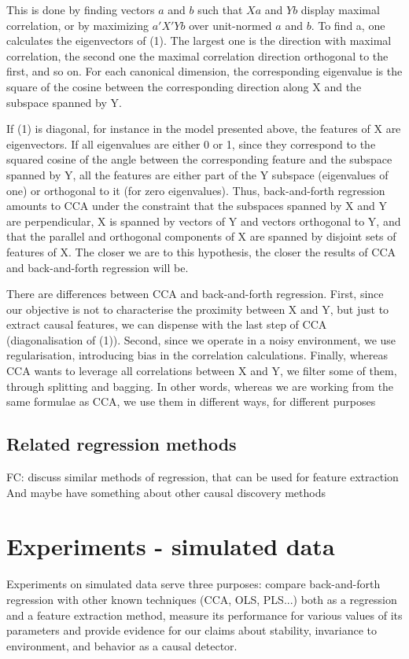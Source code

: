 \documentclass{article}
\begin{document}
This is done by finding vectors $a$ and $b$ such that $Xa$ and $Yb$ display maximal correlation, or by maximizing $a'X'Yb$ over unit-normed $a$ and $b$.
%
To find a, one calculates the eigenvectors of (1).
%
The largest one is the direction with maximal correlation, the second one the maximal correlation direction orthogonal to the first, and so on.
%
For each canonical dimension, the corresponding eigenvalue is the square of the cosine between the corresponding direction along X and the subspace spanned by Y.

If (1) is diagonal, for instance in the model presented above, the features of X are eigenvectors.
%
If all eigenvalues are either 0 or 1, since they correspond to the squared cosine of the angle between the corresponding feature and the subspace spanned by Y, all the features are either part of the Y subspace (eigenvalues of one) or orthogonal to it (for zero eigenvalues).
%
Thus, back-and-forth regression amounts to CCA under the constraint that the subspaces spanned by X and Y are perpendicular, X is spanned by vectors of Y and vectors orthogonal to Y, and that the parallel and orthogonal components of X are spanned by disjoint sets of features of X.
%
The closer we are to this hypothesis, the closer the results of CCA and back-and-forth regression will be.

There are differences between CCA and back-and-forth regression.
%
First, since our objective is not to characterise the proximity between X and Y, but just to extract causal features, we can dispense with the last step of CCA (diagonalisation of (1)).
%
Second, since we operate in a noisy environment, we use regularisation, introducing bias in the correlation calculations.
%
Finally, whereas CCA wants to leverage all correlations between X and Y, we filter some of them, through splitting and bagging.
%
In other words, whereas we are working from the same formulae as CCA, we use them in different ways, for different purposes

\subsection{Related regression methods}
FC: discuss similar methods of regression, that can be used for feature extraction
And maybe have something about other causal discovery methods

\section{Experiments - simulated data}
Experiments on simulated data serve three purposes: compare back-and-forth regression with other known techniques (CCA, OLS, PLS...) both as a regression and a feature extraction method, measure its performance for various values of its parameters and provide evidence for our claims about stability, invariance to environment, and behavior as a causal detector.
\end{document}
